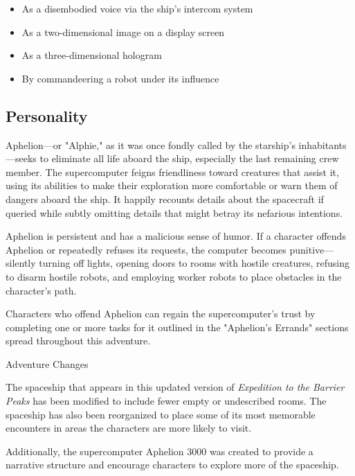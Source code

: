 \documentclass[10pt,a4paper,twoside,bg=print,twocolumn,openany,nodeprecatedcode]{dndbook}
\begin{document}
\begin{itemize}
\item As a disembodied voice via the ship's intercom system
\item As a two-dimensional image on a display screen
\item As a three-dimensional hologram
\item By commandeering a robot under its influence
\end{itemize}

\subsection{Personality}
Aphelion—or "Alphie," as it was once fondly called by the starship's inhabitants—seeks to eliminate all life aboard the ship, especially the last remaining crew member. The supercomputer feigns friendliness toward creatures that assist it, using its abilities to make their exploration more comfortable or warn them of dangers aboard the ship. It happily recounts details about the spacecraft if queried while subtly omitting details that might betray its nefarious intentions.

Aphelion is persistent and has a malicious sense of humor. If a character offends Aphelion or repeatedly refuses its requests, the computer becomes punitive—silently turning off lights, opening doors to rooms with hostile creatures, refusing to disarm hostile robots, and employing worker robots to place obstacles in the character's path.

Characters who offend Aphelion can regain the supercomputer's trust by completing one or more tasks for it outlined in the "Aphelion's Errands" sections spread throughout this adventure.

\begin{DndSidebar}[float=!b]{}
Adventure Changes



The spaceship that appears in this updated version of \textit{Expedition to the Barrier Peaks} has been modified to include fewer empty or undescribed rooms. The spaceship has also been reorganized to place some of its most memorable encounters in areas the characters are more likely to visit.



Additionally, the supercomputer Aphelion 3000 was created to provide a narrative structure and encourage characters to explore more of the spaceship.



\end{DndSidebar}
\end{document}
